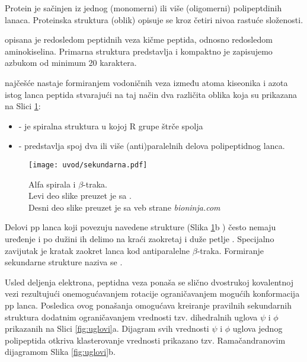 Protein je sačinjen iz jednog (monomerni) ili više (oligomerni) polipeptdinih lanaca.
Proteinska struktura (oblik) opisuje se kroz četiri nivoa rastuće složenosti.

 opisana je redosledom peptidnih veza kičme peptida,
odnosno redosledom aminokiselina. Primarna struktura predstavlja  i kompaktno je zapisujemo azbukom od minimum 20 karaktera.

 najčešće nastaje formiranjem vodoničnih veza
između atoma kiseonika i azota istog lanca peptida stvarajući na taj način
dva različita oblika koja su prikazana na Slici \ref{fig:sekundarna}:
\begin{itemize}
  \item {} - je spiralna struktura u kojoj R grupe štrče spolja
  \item {}  - predstavlja spoj dva ili više (anti)paralelnih delova polipeptidnog lanca.
\end{itemize}

\begin{figure}[th]
\centering
\hspace*{-2.0cm} 
\texttt{[image: uvod/sekundarna.pdf]}
\caption {
  Alfa spirala i $\beta$-traka.\\ \footnotesize Levi deo slike preuzet je sa \parencite{sekundarna_ref}.\\
  Desni deo slike preuzet je sa veb strane \textit{bioninja.com}
}
\label{fig:sekundarna}
\end{figure}

Delovi pp lanca  koji povezuju navedene strukture (Slika \ref{fig:sekundarna}b ) često nemaju uređenje i po dužini ih delimo na kraći zaokretaj i duže
petlje . Specijalno zavijutak  je
kratak zaokret lanca kod antiparalelne $\beta$-traka.
Formiranje sekundarne strukture naziva se .

Usled deljenja elektrona,  peptidna veza ponaša se slično dvostrukoj kovalentnoj
vezi rezultujući onemogućavanjem rotacije ograničavanjem mogućih konformacija pp lanca.
Posledica ovog ponašanja omogućava kreiranje pravilnih sekundarnih struktura
dodatnim ograničavanjem vrednosti tzv.  dihedralnih uglova $\psi$ i $\phi$ prikazanih
na Slici \ref{fig:uglovi}a.  Dijagram svih vrednosti $\psi$ i $\phi$ uglova
jednog polipeptida otkriva klasterovanje vrednosti prikazano tzv. Ramačandranovim
dijagramom Slika \ref{fig:uglovi}b.

